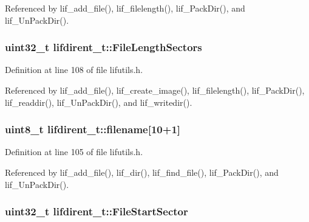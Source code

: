 Referenced by lif\+\_\+add\+\_\+file(), lif\+\_\+filelength(), lif\+\_\+\+Pack\+Dir(), and lif\+\_\+\+Un\+Pack\+Dir().

\subsubsection[{\texorpdfstring{File\+Length\+Sectors}{FileLengthSectors}}]{\setlength{\rightskip}{0pt plus 5cm}uint32\+\_\+t lifdirent\+\_\+t\+::\+File\+Length\+Sectors}\hypertarget{structlifdirent__t_a0770652809bb32a115c7f30035a13208}{}\label{structlifdirent__t_a0770652809bb32a115c7f30035a13208}


Definition at line 108 of file lifutils.\+h.



Referenced by lif\+\_\+add\+\_\+file(), lif\+\_\+create\+\_\+image(), lif\+\_\+filelength(), lif\+\_\+\+Pack\+Dir(), lif\+\_\+readdir(), lif\+\_\+\+Un\+Pack\+Dir(), and lif\+\_\+writedir().

\subsubsection[{\texorpdfstring{filename}{filename}}]{\setlength{\rightskip}{0pt plus 5cm}uint8\+\_\+t lifdirent\+\_\+t\+::filename\mbox{[}10+1\mbox{]}}\hypertarget{structlifdirent__t_ac0d5353d2e81494997b15597377de032}{}\label{structlifdirent__t_ac0d5353d2e81494997b15597377de032}


Definition at line 105 of file lifutils.\+h.



Referenced by lif\+\_\+add\+\_\+file(), lif\+\_\+dir(), lif\+\_\+find\+\_\+file(), lif\+\_\+\+Pack\+Dir(), and lif\+\_\+\+Un\+Pack\+Dir().

\subsubsection[{\texorpdfstring{File\+Start\+Sector}{FileStartSector}}]{\setlength{\rightskip}{0pt plus 5cm}uint32\+\_\+t lifdirent\+\_\+t\+::\+File\+Start\+Sector}\hypertarget{structlifdirent__t_a87df04d1aa76daa4b9500f2f2e44ecaa}{}\label{structlifdirent__t_a87df04d1aa76daa4b9500f2f2e44ecaa}


